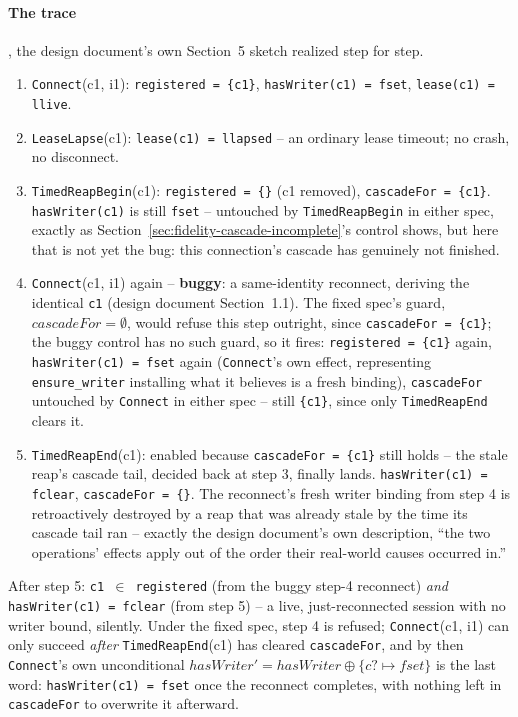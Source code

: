 \documentclass[a4paper,10pt,fleqn]{article}
\begin{document}
\paragraph{The trace}, the design document's own Section~5 sketch realized
step for step.
\begin{enumerate}
  \item \texttt{Connect}(c1, i1): \texttt{registered = \{c1\}},
    \texttt{hasWriter(c1) = fset}, \texttt{lease(c1) = llive}.
  \item \texttt{LeaseLapse}(c1): \texttt{lease(c1) = llapsed} -- an
    ordinary lease timeout; no crash, no disconnect.
  \item \texttt{TimedReapBegin}(c1): \texttt{registered = \{\}} (c1
    removed), \texttt{cascadeFor = \{c1\}}. \texttt{hasWriter(c1)} is
    still \texttt{fset} -- untouched by \texttt{TimedReapBegin} in either
    spec, exactly as Section~\ref{sec:fidelity-cascade-incomplete}'s
    control shows, but here that is not yet the bug: this connection's
    cascade has genuinely not finished.
  \item \texttt{Connect}(c1, i1) again -- \textbf{buggy}: a same-identity
    reconnect, deriving the identical \texttt{c1} (design document
    Section~1.1). The fixed spec's guard, \texttt{$cascadeFor =
    \emptyset$}, would refuse this step outright, since
    \texttt{cascadeFor = \{c1\}}; the buggy control has no such guard, so
    it fires: \texttt{registered = \{c1\}} again, \texttt{hasWriter(c1) =
    fset} again (\texttt{Connect}'s own effect, representing
    \texttt{ensure\_writer} installing what it believes is a fresh
    binding), \texttt{cascadeFor} untouched by \texttt{Connect} in either
    spec -- still \texttt{\{c1\}}, since only \texttt{TimedReapEnd}
    clears it.
  \item \texttt{TimedReapEnd}(c1): enabled because \texttt{cascadeFor =
    \{c1\}} still holds -- the stale reap's cascade tail, decided back at
    step 3, finally lands. \texttt{hasWriter(c1) = fclear},
    \texttt{cascadeFor = \{\}}. The reconnect's fresh writer binding from
    step 4 is retroactively destroyed by a reap that was already stale by
    the time its cascade tail ran -- exactly the design document's own
    description, ``the two operations' effects apply out of the order
    their real-world causes occurred in.''
\end{enumerate}

After step 5: \texttt{c1 \(\in\) registered} (from the buggy step-4
reconnect) \emph{and} \texttt{hasWriter(c1) = fclear} (from step 5) -- a
live, just-reconnected session with no writer bound, silently. Under the
fixed spec, step 4 is refused; \texttt{Connect}(c1, i1) can only succeed
\emph{after} \texttt{TimedReapEnd}(c1) has cleared \texttt{cascadeFor},
and by then \texttt{Connect}'s own unconditional
\texttt{$hasWriter' = hasWriter \oplus \{c? \mapsto fset\}$} is the last
word: \texttt{hasWriter(c1) = fset} once the reconnect completes, with
nothing left in \texttt{cascadeFor} to overwrite it afterward.
\end{document}
